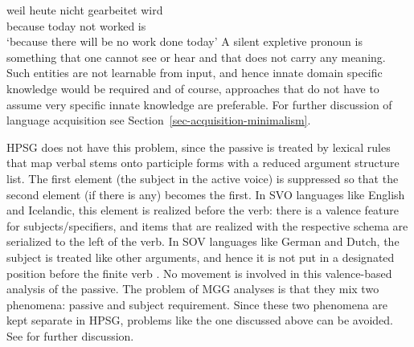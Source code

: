 \documentclass[output=paper
                ,modfonts
                ,nonflat
	        ,collection
	        ,collectionchapter
	        ,collectiontoclongg
 	        ,biblatex
                ,babelshorthands
                ,newtxmath
                ,draftmode
                ,colorlinks, citecolor=brown
]{./langsci/langscibook}
\begin{document}
\ea
\gll weil heute nicht gearbeitet wird\\
     because today not worked is\\
\glt `because there will be no work done today'
\z
A silent expletive pronoun is something that one cannot see or hear and that does not carry any
meaning. Such entities are not learnable from input, and hence innate domain specific knowledge would
be required and of course, approaches that do not have to assume very specific innate knowledge are
preferable. For further discussion of language acquisition see Section~\ref{sec-acquisition-minimalism}.%

HPSG does not have this problem, since the passive is treated by lexical rules that map verbal stems onto
participle forms with a reduced argument structure list. The first element (the subject in the
active voice) is suppressed so that the second element (if there is any) becomes the first. In SVO languages
like English and Icelandic, this element is realized before the verb: there is a valence feature for
subjects/specifiers, and items that are realized with the respective schema are serialized to the
left of the verb. In SOV languages like German and Dutch, the subject is treated like other arguments,
and hence it is not put in a designated position before the finite verb . No movement is
involved in this valence-based analysis of the passive. The problem of MGG analyses is that they mix two phenomena: passive and subject
requirement. Since these two phenomena are kept separate in HPSG, problems like the one discussed
above can be avoided. See  for further discussion.

\end{document}
